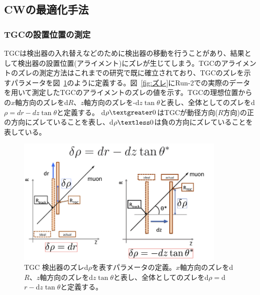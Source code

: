 \subsection{CWの最適化手法}
\subsubsection{TGCの設置位置の測定}\label{ズレ}
TGCは検出器の入れ替えなどのために検出器の移動を行うことがあり、結果として検出器の設置位置(アライメント)にズレが生じてしまう。TGCのアライメントのズレの測定方法はこれまでの研究\cite{article:sano-mron}で既に確立されており、TGCのズレを示すパラメータを図~\ref{fig:dr_para}のように定義する。図~\ref{fig:ズレ}にRun-2での実際のデータを用いて測定したTGCのアライメントのズレの値を示す。TGCの理想位置からの$x$軸方向のズレをd$R$、$z$軸方向のズレを-d$z\tan\theta$と表し、全体としてのズレをd$\rho = dr-dz\tan\theta$と定義する。
d$\rho \textgreater 0$はTGCが動径方向($R$方向)の正の方向にズレていることを表し、d$\rho \textless 0$は負の方向にズレていることを表している。
\begin{figure}[tb]
  \centering
  \includegraphics[clip, width=10cm]{fig/3/drho_param_position_measurement.png}
  \caption{TGC 検出器のズレd$\rho$を表すパラメータの定義\cite{article:yamauti-mron}。$x$軸方向のズレをd$R$、$z$軸方向のズレをd$z\tan\theta$と表し、全体としてのズレをd$\rho = $d$r-$d$z\tan\theta$と定義する。}
  \label{fig:dr_para}
\end{figure}

